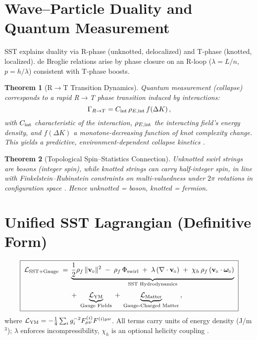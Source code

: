 \documentclass[11pt]{article}
\newtheorem{theorem}{Theorem}[section]
\begin{document}
	\section{Wave--Particle Duality and Quantum Measurement}

	SST explains duality via R-phase (unknotted, delocalized) and T-phase (knotted, localized). de Broglie relations arise by phase closure on an R-loop ($\lambda=L/n$, $p=h/\lambda$) consistent with T-phase boosts.

	\begin{theorem}[R$\to$T Transition Dynamics]
		Quantum measurement (collapse) corresponds to a rapid R$\to$T phase transition induced by interactions:
		\[
			\Gamma_{R\to T} = C_{\rm int}\,\rho_{E,\rm int}\,f(\Delta K)\,,
		\]
		with $C_{\rm int}$ characteristic of the interaction, $\rho_{E,\rm int}$ the interacting field’s energy density, and $f(\Delta K)$ a monotone-decreasing function of knot complexity change. This yields a predictive, environment-dependent collapse kinetics \cite{Zurek2003,Iskandarani2025DoubleSlit}.
	\end{theorem}

	\begin{theorem}[Topological Spin--Statistics Connection]
		Unknotted swirl strings are bosons (integer spin), while knotted strings can carry half-integer spin, in line with Finkelstein--Rubinstein constraints on multi-valuedness under $2\pi$ rotations in configuration space \cite{FinkelsteinRubinstein1968}. Hence \emph{unknotted = boson}, \emph{knotted = fermion}.
	\end{theorem}

	\section{Unified SST Lagrangian (Definitive Form)}

	\[
		\boxed{\;
			\begin{aligned}
				\mathcal{L}_{\rm SST+Gauge} \;=\; &\underbrace{\frac{1}{2}\rho_f\,\|\mathbf{v}_{\!\!\;\circ}\|^2 \;-\; \rho_f\,\Phi_{\rm swirl} \;+\; \lambda\,(\nabla\cdot\mathbf{v}_{\!\!\;\circ}) \;+\; \chi_h\,\rho_f\,(\mathbf{v}_{\!\!\;\circ}\cdot\boldsymbol{\omega}_{\!\!\;\circ})}_{\text{SST Hydrodynamics}} \\[0.5ex]
				&+\; \underbrace{\mathcal{L}_{\rm YM}}_{\text{Gauge Fields}} \;+\; \underbrace{\mathcal{L}_{\rm Matter}}_{\text{Gauge-Charged Matter}}\,,
			\end{aligned}
			\;}
	\]
	where $\mathcal{L}_{\rm YM} = -\frac{1}{4}\sum_i g_i^{-2}F_{\mu\nu}^{(i)}F^{(i)\mu\nu}$. All terms carry units of energy density (J/m$^3$); $\lambda$ enforces incompressibility, $\chi_h$ is an optional helicity coupling \cite{Batchelor1967,Saffman1992,ChoFaddeevNiemi1999,Iskandarani2025Canon034}.
\end{document}

